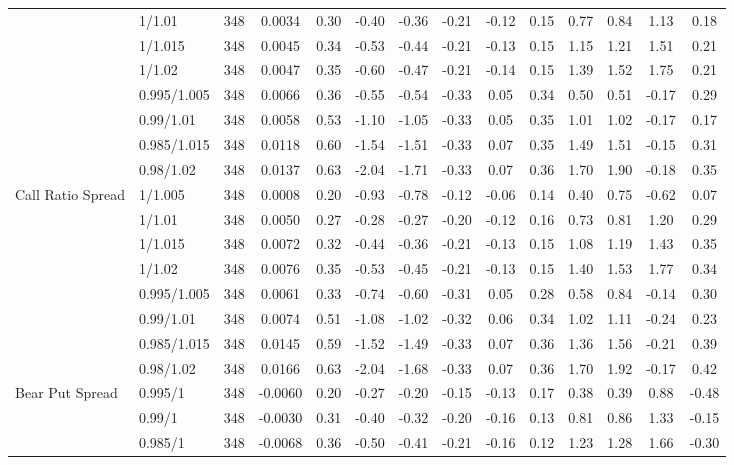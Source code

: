 \begin{tabular}{llcccccccccccc}
 & 1/1.01 & 348 & 0.0034 & 0.30 & -0.40 & -0.36 & -0.21 & -0.12 & 0.15 & 0.77 & 0.84 & 1.13 & 0.18 \\
 & 1/1.015 & 348 & 0.0045 & 0.34 & -0.53 & -0.44 & -0.21 & -0.13 & 0.15 & 1.15 & 1.21 & 1.51 & 0.21 \\
 & 1/1.02 & 348 & 0.0047 & 0.35 & -0.60 & -0.47 & -0.21 & -0.14 & 0.15 & 1.39 & 1.52 & 1.75 & 0.21 \\
 & 0.995/1.005 & 348 & 0.0066 & 0.36 & -0.55 & -0.54 & -0.33 & 0.05 & 0.34 & 0.50 & 0.51 & -0.17 & 0.29 \\
 & 0.99/1.01 & 348 & 0.0058 & 0.53 & -1.10 & -1.05 & -0.33 & 0.05 & 0.35 & 1.01 & 1.02 & -0.17 & 0.17 \\
 & 0.985/1.015 & 348 & 0.0118 & 0.60 & -1.54 & -1.51 & -0.33 & 0.07 & 0.35 & 1.49 & 1.51 & -0.15 & 0.31 \\
 & 0.98/1.02 & 348 & 0.0137 & 0.63 & -2.04 & -1.71 & -0.33 & 0.07 & 0.36 & 1.70 & 1.90 & -0.18 & 0.35 \\
Call Ratio Spread & 1/1.005 & 348 & 0.0008 & 0.20 & -0.93 & -0.78 & -0.12 & -0.06 & 0.14 & 0.40 & 0.75 & -0.62 & 0.07 \\
 & 1/1.01 & 348 & 0.0050 & 0.27 & -0.28 & -0.27 & -0.20 & -0.12 & 0.16 & 0.73 & 0.81 & 1.20 & 0.29 \\
 & 1/1.015 & 348 & 0.0072 & 0.32 & -0.44 & -0.36 & -0.21 & -0.13 & 0.15 & 1.08 & 1.19 & 1.43 & 0.35 \\
 & 1/1.02 & 348 & 0.0076 & 0.35 & -0.53 & -0.45 & -0.21 & -0.13 & 0.15 & 1.40 & 1.53 & 1.77 & 0.34 \\
 & 0.995/1.005 & 348 & 0.0061 & 0.33 & -0.74 & -0.60 & -0.31 & 0.05 & 0.28 & 0.58 & 0.84 & -0.14 & 0.30 \\
 & 0.99/1.01 & 348 & 0.0074 & 0.51 & -1.08 & -1.02 & -0.32 & 0.06 & 0.34 & 1.02 & 1.11 & -0.24 & 0.23 \\
 & 0.985/1.015 & 348 & 0.0145 & 0.59 & -1.52 & -1.49 & -0.33 & 0.07 & 0.36 & 1.36 & 1.56 & -0.21 & 0.39 \\
 & 0.98/1.02 & 348 & 0.0166 & 0.63 & -2.04 & -1.68 & -0.33 & 0.07 & 0.36 & 1.70 & 1.92 & -0.17 & 0.42 \\
Bear Put Spread & 0.995/1 & 348 & -0.0060 & 0.20 & -0.27 & -0.20 & -0.15 & -0.13 & 0.17 & 0.38 & 0.39 & 0.88 & -0.48 \\
 & 0.99/1 & 348 & -0.0030 & 0.31 & -0.40 & -0.32 & -0.20 & -0.16 & 0.13 & 0.81 & 0.86 & 1.33 & -0.15 \\
 & 0.985/1 & 348 & -0.0068 & 0.36 & -0.50 & -0.41 & -0.21 & -0.16 & 0.12 & 1.23 & 1.28 & 1.66 & -0.30 \\

\end{tabular}
